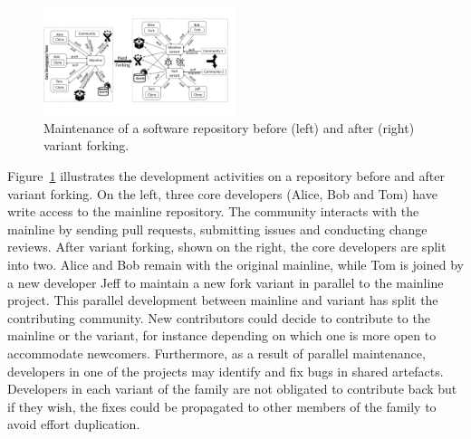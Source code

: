 \begin{figure}[ht]
  \begin{center}
  \small
    \includegraphics[width=0.5\textwidth]{figures/Collaboration.pdf}
  \end{center}
  \caption{Maintenance of a software repository before (left) and after (right) variant forking.}
  \label{fig:forking}
\end{figure}

Figure~\ref{fig:forking} illustrates the development activities on a repository before and after variant forking.
On the left, three core developers (Alice, Bob and Tom) have write access to the mainline repository.%
The community interacts with the mainline by sending pull requests, submitting issues and conducting change reviews.
After variant forking, shown on the right, the core developers are split into two.
Alice and Bob remain with the original mainline, while Tom is joined by a new developer Jeff to maintain a new fork variant in parallel to the mainline project.
This parallel development between mainline and variant has split the contributing community. New contributors could decide to contribute to the mainline or the variant, for instance depending on which one is more open to accommodate newcomers.
Furthermore, as a result of parallel maintenance, developers in one of the projects may identify and fix bugs in shared artefacts.
Developers in each variant of the family are not obligated to contribute back but if they wish, the fixes could be propagated to other members of the family to avoid effort duplication.

